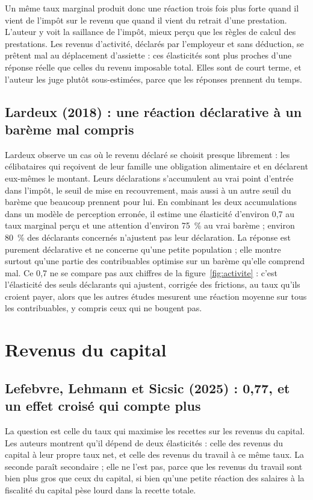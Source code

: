 \documentclass[11pt,a4paper]{article}
\begin{document}
Un même taux marginal produit donc une réaction trois fois plus forte quand il vient de l'impôt sur
le revenu que quand il vient du retrait d'une prestation. L'auteur y voit la saillance de l'impôt,
mieux perçu que les règles de calcul des prestations. Les revenus d'activité, déclarés par
l'employeur et sans déduction, se prêtent mal au déplacement d'assiette : ces élasticités sont plus
proches d'une réponse réelle que celles du revenu imposable total. Elles sont de court terme, et
l'auteur les juge plutôt sous-estimées, parce que les réponses prennent du temps.

\subsection{Lardeux (2018) : une réaction déclarative à un barème mal compris}

Lardeux observe un cas où le revenu déclaré se choisit presque librement : les célibataires qui
reçoivent de leur famille une obligation alimentaire et en déclarent eux-mêmes le montant. Leurs
déclarations s'accumulent au vrai point d'entrée dans l'impôt, le seuil de mise en recouvrement,
mais aussi à un autre seuil du barème que beaucoup prennent pour lui. En combinant les deux
accumulations dans un modèle de perception erronée, il estime une élasticité d'environ 0,7 au taux
marginal perçu et une attention d'environ 75~\% au vrai barème ; environ 80~\% des déclarants
concernés n'ajustent pas leur déclaration. La réponse est purement déclarative et ne concerne qu'une
petite population ; elle montre surtout qu'une partie des contribuables optimise sur un barème
qu'elle comprend mal. Ce 0,7 ne se compare pas aux chiffres de la figure~\ref{fig:activite} :
c'est l'élasticité des seuls déclarants qui ajustent, corrigée des frictions, au taux qu'ils croient
payer, alors que les autres études mesurent une réaction moyenne sur tous les contribuables, y
compris ceux qui ne bougent pas.

\section{Revenus du capital}

\subsection{Lefebvre, Lehmann et Sicsic (2025) : 0,77, et un effet croisé qui compte plus}

La question est celle du taux qui maximise les recettes sur les revenus du capital. Les auteurs
montrent qu'il dépend de deux élasticités : celle des revenus du capital à leur propre taux net, et
celle des revenus du travail à ce même taux. La seconde paraît secondaire ; elle ne l'est pas, parce
que les revenus du travail sont bien plus gros que ceux du capital, si bien qu'une petite réaction
des salaires à la fiscalité du capital pèse lourd dans la recette totale.
\end{document}
